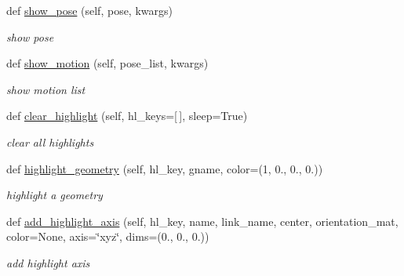 \begin{DoxyCompactItemize}
def \hyperlink{classrnb-planning_1_1src_1_1pkg_1_1geometry_1_1geometry_1_1_geometry_scene_ac826402b53bcfa3d5adbe3bb888e109a}{show\+\_\+pose} (self, pose, kwargs)
\begin{DoxyCompactList}\small\item\em show pose \end{DoxyCompactList}\item 
def \hyperlink{classrnb-planning_1_1src_1_1pkg_1_1geometry_1_1geometry_1_1_geometry_scene_ac7296a3e416eb8dfce8093edcb08a6f0}{show\+\_\+motion} (self, pose\+\_\+list, kwargs)
\begin{DoxyCompactList}\small\item\em show motion list \end{DoxyCompactList}\item 
\mbox{\label{classrnb-planning_1_1src_1_1pkg_1_1geometry_1_1geometry_1_1_geometry_scene_a9835e94fc89783da667fffb24f3eced5}} 
def \hyperlink{classrnb-planning_1_1src_1_1pkg_1_1geometry_1_1geometry_1_1_geometry_scene_a9835e94fc89783da667fffb24f3eced5}{clear\+\_\+highlight} (self, hl\+\_\+keys=\mbox{[}$\,$\mbox{]}, sleep=True)
\begin{DoxyCompactList}\small\item\em clear all highlights \end{DoxyCompactList}\item 
\mbox{\label{classrnb-planning_1_1src_1_1pkg_1_1geometry_1_1geometry_1_1_geometry_scene_abf2dbe4006df5fa7e51d992af994efbe}} 
def \hyperlink{classrnb-planning_1_1src_1_1pkg_1_1geometry_1_1geometry_1_1_geometry_scene_abf2dbe4006df5fa7e51d992af994efbe}{highlight\+\_\+geometry} (self, hl\+\_\+key, gname, color=(1, 0., 0., 0.))
\begin{DoxyCompactList}\small\item\em highlight a geometry \end{DoxyCompactList}\item 
\mbox{\label{classrnb-planning_1_1src_1_1pkg_1_1geometry_1_1geometry_1_1_geometry_scene_a922fc25fb7bd03b2a012f22dff9bf93c}} 
def \hyperlink{classrnb-planning_1_1src_1_1pkg_1_1geometry_1_1geometry_1_1_geometry_scene_a922fc25fb7bd03b2a012f22dff9bf93c}{add\+\_\+highlight\+\_\+axis} (self, hl\+\_\+key, name, link\+\_\+name, center, orientation\+\_\+mat, color=None, axis=\char`\"{}xyz\char`\"{}, dims=(0., 0., 0.))
\begin{DoxyCompactList}\small\item\em add highlight axis \end{DoxyCompactList}\end{DoxyCompactItemize}
